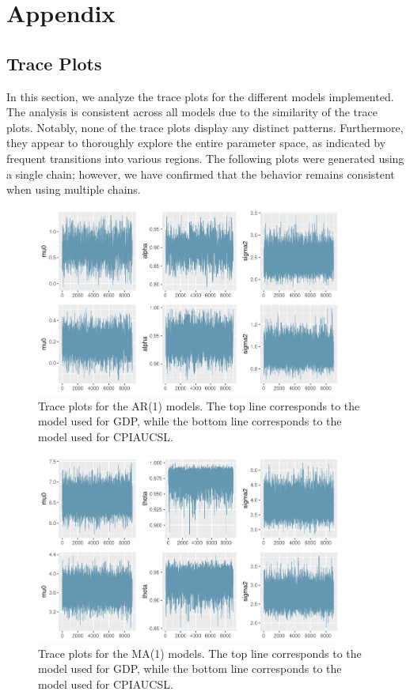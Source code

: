 \section{Appendix}
\subsection*{Trace Plots}
In this section, we analyze the trace plots for the different models implemented. The analysis is consistent across all models due to the similarity of the trace plots. Notably, none of the trace plots display any distinct patterns. Furthermore, they appear to thoroughly explore the entire parameter space, as indicated by frequent transitions into various regions. The following plots were generated using a single chain; however, we have confirmed that the behavior remains consistent when using multiple chains.
\begin{figure}[H]
    \centering
    \includegraphics[width=0.9\textwidth]{images/2-AR/traceplots.png}
    \caption{Trace plots for the AR(1) models. The top line corresponds to the model used for GDP, while the bottom line corresponds to the model used for CPIAUCSL.}
\end{figure}
\begin{figure}[H]
    \centering
    \includegraphics[width=0.9\textwidth]{images/3-MA/traceplots.png}
    \caption{Trace plots for the MA(1) models. The top line corresponds to the model used for GDP, while the bottom line corresponds to the model used for CPIAUCSL.}
\end{figure}
